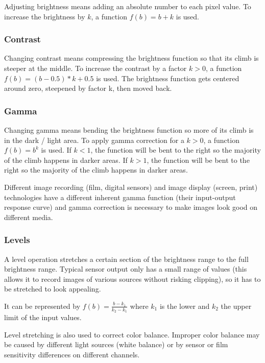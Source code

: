 \documentclass{article}
\begin{document}
Adjusting brightness means adding an absolute number to each pixel value.
To increase the brightness by $k$, a function $f(b) = b + k$ is used.

\subsubsection{Contrast}

Changing contrast means compressing the brightness function so that its climb
is steeper at the middle.
To increase the contrast by a factor $k > 0$, a function $f(b) = (b - 0.5) * k + 0.5$ is used.
The brightness function gets centered around zero, steepened by factor k, then moved
back.

\subsubsection{Gamma}

Changing gamma means bending the brightness function so more of its climb
is in the dark / light area.
To apply gamma correction for a $k > 0$, a function $f(b) = b^k$ is used.
If $k < 1$, the function will be bent to the right so the majority of the climb
happens in darker areas.
If $k > 1$, the function will be bent to the right so the majority of the climb
happens in darker areas.

Different image recording (film, digital sensors) and image display (screen, print)
technologies have a different inherent gamma function (their input-output response curve)
and gamma correction is necessary to make images look good on different media.

\subsubsection{Levels}

A level operation stretches a certain section of the brightness range to
the full brightness range. Typical sensor output only has a small range of values
(this allows it to record images of various sources without risking clipping),
so it has to be stretched to look appealing.

It can be represented by $f(b) = \frac{b - k_1}{k_2 - k_1}$ where $k_1$ is the lower
and $k_2$ the upper limit of the input values.

Level stretching is also used to correct color balance. Improper color balance may
be caused by different light sources (white balance) or by sensor or film sensitivity
differences on different channels.
\end{document}
